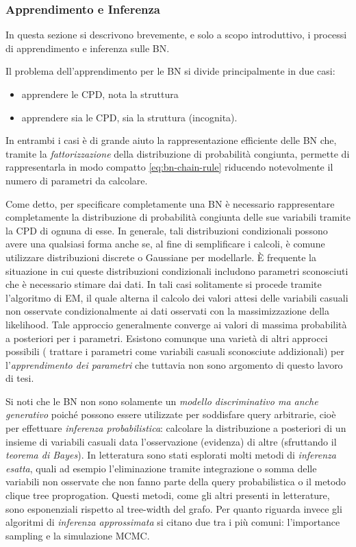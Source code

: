 \subsubsection{Apprendimento e Inferenza}\acresetall
In questa sezione si descrivono brevemente, e solo a scopo introduttivo, i processi di apprendimento e inferenza sulle \acl{BN}.

Il problema dell'apprendimento per le \acl{BN} si divide principalmente in due casi:
\begin{itemize}
    \item apprendere le \acs{CPD}, nota la struttura 
    \item apprendere sia le \acs{CPD}, sia la struttura (incognita).
\end{itemize}
In entrambi i casi è di grande aiuto la rappresentazione efficiente delle \acl{BN} che, tramite la \emph{fattorizzazione} della distribuzione di probabilità congiunta, permette di rappresentarla in modo compatto \eqref{eq:bn-chain-rule} riducendo notevolmente il numero di parametri da calcolare.

Come detto, per specificare completamente una \acl{BN} è necessario rappresentare completamente la distribuzione di probabilità congiunta delle sue variabili tramite la \acl{CPD} di ognuna di esse. In generale, tali distribuzioni condizionali possono avere una qualsiasi forma anche se, al fine di semplificare i calcoli, è comune utilizzare distribuzioni discrete o Gaussiane per modellarle. \`E frequente la situazione in cui queste distribuzioni condizionali includono parametri sconosciuti che è necessario stimare dai dati. In tali casi solitamente si procede tramite l'algoritmo di \acf{EM}, il quale alterna il calcolo dei valori attesi delle variabili casuali non osservate condizionalmente ai dati osservati con la massimizzazione della likelihood. Tale approccio generalmente converge ai valori di massima probabilità a posteriori per i parametri. Esistono comunque una varietà di altri approcci possibili (\eg{} trattare i parametri come variabili casuali sconosciute addizionali) per l'\emph{apprendimento dei parametri} che tuttavia non sono argomento di questo lavoro di tesi.

Si noti che le \acl{BN} non sono solamente un \emph{modello discriminativo ma anche generativo} poiché possono essere utilizzate per soddisfare query arbitrarie, cioè per effettuare \emph{inferenza probabilistica}: calcolare la distribuzione a posteriori di un insieme di variabili casuali data l'osservazione (evidenza) di altre (sfruttando il \emph{teorema di Bayes}). In letteratura sono stati esplorati molti metodi di \emph{inferenza esatta}, quali ad esempio l'eliminazione tramite integrazione o somma delle variabili non osservate che non fanno parte della query probabilistica o il metodo clique tree proprogation. Questi metodi, come gli altri presenti in letterature, sono esponenziali rispetto al tree-width del grafo. Per quanto riguarda invece gli algoritmi di \emph{inferenza approssimata} si citano due tra i più comuni: l'importance sampling e la simulazione \acf{MCMC}.

